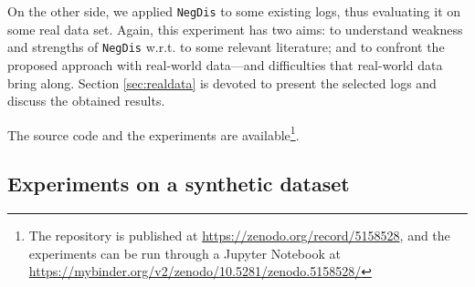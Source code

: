\documentclass[a4wide,11pt]{article}
\theoremstyle{definition}
\theoremstyle{plain}
\newcommand{\nd}{\texttt{NegDis}\xspace}
\begin{document}
On the other side, we applied \nd to some existing logs, thus evaluating it on some real data set. Again, this experiment has two aims: to understand weakness and strengths of \nd w.r.t. to some relevant literature; and to confront the proposed approach with real-world data---and difficulties that real-world data bring along. Section \ref{sec:realdata} is devoted to present the selected logs and discuss the obtained results.

The source code and the experiments are available\footnote{The repository is published at \url{https://zenodo.org/record/5158528}, and the experiments can be run through a Jupyter Notebook at \url{https://mybinder.org/v2/zenodo/10.5281/zenodo.5158528/}}.




\subsection{Experiments on a synthetic dataset}
\label{sec:syntheticlog}

%

\end{document}
